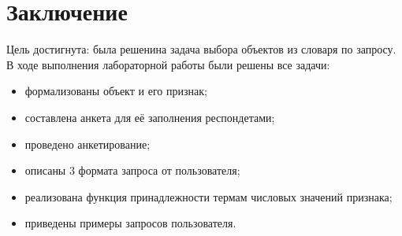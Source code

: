 \chapter*{Заключение}

Цель достигнута: была решенина задача выбора объектов из словаря по запросу.
В ходе выполнения лабораторной работы были решены все задачи:
\begin{itemize}
	\item формализованы объект и его признак;
	\item составлена анкета для её заполнения респондетами;
	\item проведено анкетирование;
	\item описаны 3 формата запроса от пользователя;
	\item реализована функция принадлежности термам числовых значений признака;
	\item приведены примеры запросов пользователя.
\end{itemize}




